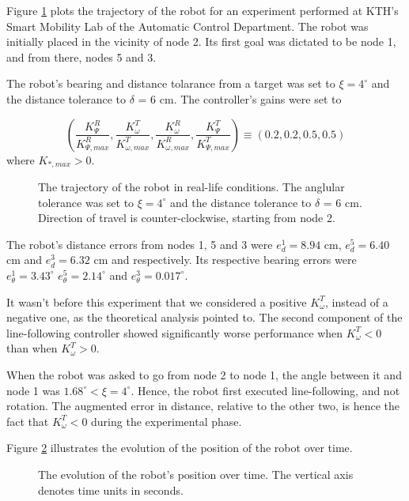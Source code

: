 Figure \ref{fig:22_map_7} plots the trajectory of the robot for an experiment
performed at KTH's Smart Mobility Lab of the Automatic Control Department. The
robot was initially placed in the vicinity of node 2. Its first goal was
dictated to be node 1, and from there, nodes 5 and 3.

The robot's bearing and distance tolarance from a target was set to
$\xi = 4^{\circ}$ and the distance tolerance to $\delta$ = 6 cm. The controller's
gains were set to

$$(\dfrac{K_{\Psi}^R}{K_{\Psi,max}^R}, \dfrac{K_{\omega}^T}{K_{\omega, max}^T}, \dfrac{K_{\omega}^R}{K_{\omega,max}^R}, \dfrac{K_{\Psi}^T}{K_{\Psi,max}^T})
\equiv (0.2, 0.2, 0.5, 0.5)$$
where $K_{*,max} > 0$.

\begin{figure}\centering
  \scalebox{1}{}
  \caption{The trajectory of the robot in real-life conditions. The anglular
    tolerance was set to $\xi = 4^{\circ}$ and the distance tolerance to
    $\delta$ = 6 cm. Direction of travel is counter-clockwise, starting from node 2.}
  \label{fig:22_map_7}
\end{figure}

The robot's distance errors from nodes 1, 5 and 3 were $e_d^1 = 8.94$ cm,
$e_d^5 = 6.40$ cm and $e_d^3 = 6.32$ cm and respectively. Its respective bearing
errors were $e_{\theta}^1 = 3.43^{\circ}$ $e_{\theta}^5 = 2.14^{\circ}$ and
$e_{\theta}^3 = 0.017^{\circ}$.

It wasn't before this experiment that we considered a
positive $K_{\omega}^T$, instead of a negative one, as the theoretical analysis
pointed to. The second component of the line-following controller showed
significantly worse performance when $K_{\omega}^T < 0$ than when $K_{\omega}^T > 0$.

When the robot was asked to go from node 2 to node 1, the angle between it and
node 1 was $1.68^{\circ} < \xi = 4^{\circ}$. Hence, the robot first executed
line-following, and not rotation. The augmented error in distance,
relative to the other two, is hence the fact that $K_{\omega}^T < 0$ during the
experimental phase.

Figure \ref{fig:22_map_7_xyt} illustrates the evolution of the position of the
robot over time.

\begin{figure}[H]\centering
  \scalebox{0.7}{}
  \caption{The evolution of the robot's position over time. The vertical axis
    denotes time units in seconds.}
  \label{fig:22_map_7_xyt}
\end{figure}

